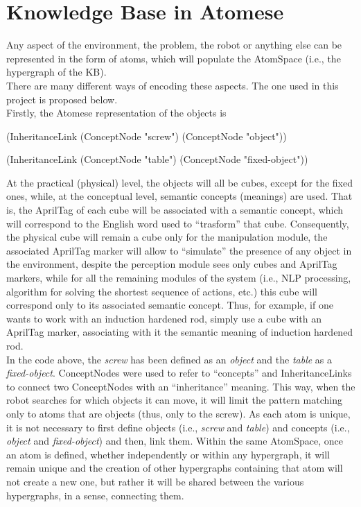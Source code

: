 \section{Knowledge Base in Atomese}\label{sec:env_atomese}

Any aspect of the environment, the problem, the robot or anything else can be represented in the form of atoms, which will populate the AtomSpace (i.e., the hypergraph of the KB). \\
There are many different ways of encoding these aspects. The one used in this project is proposed below. \\

Firstly, the Atomese representation of the objects is \\
\begin{python}
	(InheritanceLink
		(ConceptNode "screw")
		(ConceptNode "object"))

	(InheritanceLink
		(ConceptNode "table")
		(ConceptNode "fixed-object"))
\end{python}
At the practical (physical) level, the objects will all be cubes, except for the fixed ones, while, at the conceptual level, semantic concepts (meanings) are used. That is, the AprilTag of each cube will be associated with a semantic concept, which will correspond to the English word used to \enquote{trasform} that cube. Consequently, the physical cube will remain a cube only for the manipulation module, the associated AprilTag marker will allow to \enquote{simulate} the presence of any object in the environment, despite the perception module sees only cubes and AprilTag markers, while for all the remaining modules of the system (i.e., NLP processing, algorithm for solving the shortest sequence of actions, etc.) this cube will correspond only to its associated semantic concept. Thus, for example, if one wants to work with an induction hardened rod, simply use a cube with an AprilTag marker, associating with it the semantic meaning of induction hardened rod. \\

In the code above, the \textit{screw} has been defined as an \textit{object} and the \textit{table} as a \textit{fixed-object}. 
ConceptNodes were used to refer to \enquote{concepts} and InheritanceLinks to connect two ConceptNodes with an \enquote{inheritance} meaning. This way, when the robot searches for which objects it can move, it will limit the pattern matching only to atoms that are objects (thus, only to the screw). 
As each atom is unique, it is not necessary to first define objects (i.e., \textit{screw} and \textit{table}) and concepts (i.e., \textit{object} and \textit{fixed-object}) and then, link them. Within the same AtomSpace, once an atom is defined, whether independently or within any hypergraph, it will remain unique and the creation of other hypergraphs containing that atom will not create a new one, but rather it will be shared between the various hypergraphs, in a sense, connecting them. \\

